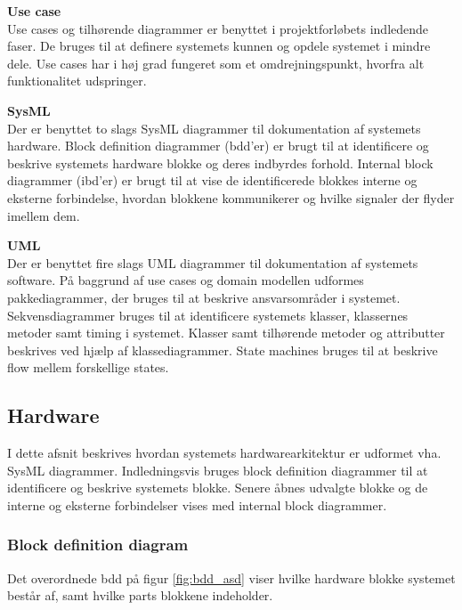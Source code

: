 \textbf{Use case}\\
Use cases og tilhørende diagrammer er benyttet i projektforløbets indledende faser. De bruges til at definere systemets kunnen og opdele systemet i mindre dele. Use cases har i høj grad fungeret som et omdrejningspunkt, hvorfra alt funktionalitet udspringer.


\textbf{SysML}\\
Der er benyttet to slags SysML diagrammer til dokumentation af systemets hardware. Block definition diagrammer (bdd'er) er brugt til at identificere og beskrive systemets hardware blokke og deres indbyrdes forhold. Internal block diagrammer (ibd'er) er brugt til at vise de identificerede blokkes interne og eksterne forbindelse, hvordan blokkene kommunikerer og hvilke signaler der flyder imellem dem.


\textbf{UML}\\
Der er benyttet fire slags UML diagrammer til dokumentation af systemets software.
På baggrund af use cases og domain modellen udformes pakkediagrammer, der bruges til at beskrive ansvarsområder i systemet. Sekvensdiagrammer bruges til at identificere systemets klasser, klassernes metoder samt timing i systemet. Klasser samt tilhørende metoder og attributter beskrives ved hjælp af klassediagrammer. State machines bruges til at beskrive flow mellem forskellige states. 


\newpage

\subsection{Hardware}
I dette afsnit beskrives hvordan systemets hardwarearkitektur er udformet vha. SysML diagrammer. Indledningsvis bruges block definition diagrammer til at identificere og beskrive systemets blokke. Senere åbnes udvalgte blokke og de interne og eksterne forbindelser vises med internal block diagrammer. 


\subsubsection*{Block definition diagram}

Det overordnede bdd på figur \ref{fig:bdd_asd} viser hvilke hardware blokke systemet består af, samt hvilke parts blokkene indeholder.

